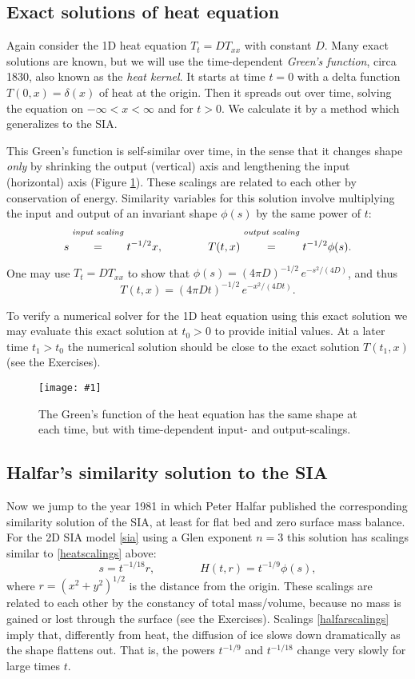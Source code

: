 \documentclass[letterpaper,final,12pt,reqno]{amsart}
\newcommand{\onefigsize}[3]{
\begin{figure}[ht]
\centering
\texttt{[image: \#1]}
\caption{#2}
\label{fig:#1}
\end{figure}}
\begin{document}
\subsection*{Exact solutions of heat equation}  Again consider the 1D heat equation $T_t = D T_{xx}$ with constant $D$.  Many exact solutions are known, but we will use the time-dependent \emph{Green's function}, circa 1830, also known as the \emph{heat kernel}.  It starts at time $t=0$ with a delta function $T(0,x)=\delta(x)$ of heat at the origin.  Then it spreads out over time, solving the equation on $-\infty<x<\infty$ and for $t>0$.  We calculate it by a method which generalizes to the SIA.

This Green's function is self-similar over time, in the sense that it changes shape \emph{only} by shrinking the output (vertical) axis and lengthening the input (horizontal) axis (Figure \ref{fig:heatscaling}).  These scalings are related to each other by conservation of energy.  Similarity variables for this solution involve multiplying the input and output of an invariant shape $\phi(s)$ by the same power of $t$:
\begin{equation}
s \stackrel{\text{\emph{input scaling}}}{\phantom{\Big|}=\phantom{\Big|}} t^{-1/2} x, \qquad\qquad T(t,x) \stackrel{\text{\emph{output scaling}}}{\phantom{\Big|}=\phantom{\Big|}} t^{-1/2} \phi(s).  \label{heatscalings}
\end{equation}
One may use $T_t = D T_{xx}$ to show that $\phi(s) = (4 \pi D)^{-1/2}\, e^{-s^2/(4D)}$, and thus
    $$T(t,x) = (4 \pi D t)^{-1/2}\, e^{-x^2/(4Dt)}.$$

To verify a numerical solver for the 1D heat equation using this exact solution we may evaluate this exact solution at $t_0>0$ to provide initial values.  At a later time $t_1>t_0$ the numerical solution should be close to the exact solution $T(t_1,x)$ (see the Exercises).

\onefigsize{heatscaling}{The Green's function of the heat equation has the same shape at each time, but with time-dependent input- and output-scalings.}{2.4in}

\subsection*{Halfar's similarity solution to the SIA}  Now we jump to the year 1981 in which Peter Halfar \cite{Halfar81} published the corresponding similarity solution of the SIA, at least for flat bed and zero surface mass balance.  For the 2D SIA model \eqref{sia} using a Glen exponent $n=3$ this solution \cite{Halfar83} has scalings similar to \eqref{heatscalings} above:
\begin{equation}
s = t^{-1/18} r, \qquad \qquad H(t,r)=t^{-1/9} \phi(s), \label{halfarscalings}
\end{equation}
where $r=(x^2+y^2)^{1/2}$ is the distance from the origin.  These scalings are related to each other by the constancy of total mass/volume, because no mass is gained or lost through the surface (see the Exercises). Scalings \eqref{halfarscalings} imply that, differently from heat, the diffusion of ice slows down dramatically as the shape flattens out.  That is, the powers $t^{-1/9}$ and $t^{-1/18}$ change very slowly for large times $t$.
\end{document}
